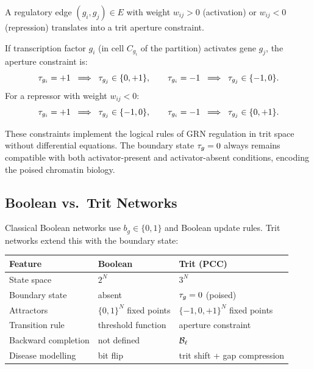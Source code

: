 A regulatory edge $(g_i, g_j) \in E$ with weight $w_{ij} > 0$ (activation)
or $w_{ij} < 0$ (repression) translates into a trit aperture constraint.

\begin{definition}
\label{def:ch05-tf-aperture}
If transcription factor $g_i$ (in cell $C_{g_i}$ of the partition) activates
gene $g_j$, the aperture constraint is:
\begin{equation}
\label{eq:ch05-tf-aperture}
    \tau_{g_i} = +1 \;\implies\; \tau_{g_j} \in \{0, +1\},
    \qquad
    \tau_{g_i} = -1 \;\implies\; \tau_{g_j} \in \{-1, 0\}.
\end{equation}
For a repressor with weight $w_{ij} < 0$:
\begin{equation}
    \tau_{g_i} = +1 \;\implies\; \tau_{g_j} \in \{-1, 0\},
    \qquad
    \tau_{g_i} = -1 \;\implies\; \tau_{g_j} \in \{0, +1\}.
\end{equation}
\end{definition}

These constraints implement the logical rules of GRN regulation in trit
space without differential equations.  The boundary state $\tau_g = 0$
always remains compatible with both activator-present and activator-absent
conditions, encoding the poised chromatin biology.

\subsection{Boolean vs.\ Trit Networks}

Classical Boolean networks use $b_g \in \{0, 1\}$ and Boolean update rules.
Trit networks extend this with the boundary state:

\begin{center}
\begin{tabular}{lll}
\toprule
\textbf{Feature} & \textbf{Boolean} & \textbf{Trit (PCC)} \\
\midrule
State space & $2^N$ & $3^N$ \\
Boundary state & absent & $\tau_g = 0$ (poised) \\
Attractors & $\{0,1\}^N$ fixed points & $\{-1,0,+1\}^N$ fixed points \\
Transition rule & threshold function & aperture constraint \\
Backward completion & not defined & $\mathcal{B}_\ell$ \\
Disease modelling & bit flip & trit shift + gap compression \\
\bottomrule
\end{tabular}
\end{center}

